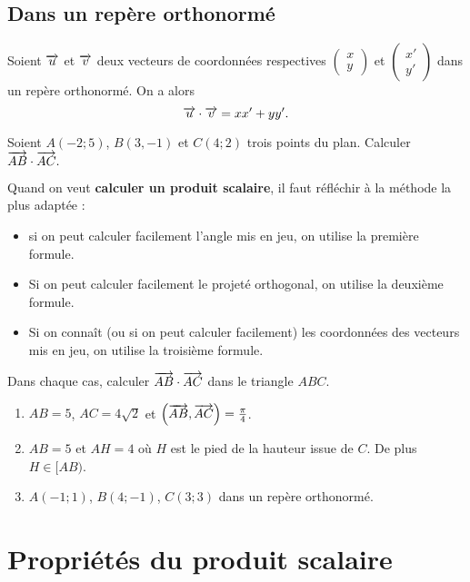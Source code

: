 \documentclass[11pt]{article}
\begin{document}
\subsection{Dans un repère orthonormé}
\begin{thm}
  Soient $\overrightarrow{u}$ et $\overrightarrow{v}$ deux vecteurs de coordonnées respectives
  $\begin{pmatrix}x\\y\end{pmatrix}$ et $\begin{pmatrix}x'\\y'\end{pmatrix}$
  dans un repère orthonormé. On a alors
  \[
    \overrightarrow{u}\cdot\overrightarrow{v} = xx'+yy'.
  \]
\end{thm}
\begin{app}
  Soient $A\left( -2;5 \right)$, $B\left( 3, -1 \right)$ et $C\left( 4; 2
  \right)$ trois points du plan. Calculer $\overrightarrow{AB}\cdot\overrightarrow{AC}.$
\end{app}
\begin{methode}
  Quand on veut \textbf{calculer un produit scalaire}, il faut réfléchir à la
  méthode la plus adaptée :
  \begin{itemize}
    \item si on peut calculer facilement l'angle mis en jeu, on utilise la
      première formule.
    \item Si on peut calculer facilement le projeté orthogonal, on utilise la
      deuxième formule.
    \item Si on connaît (ou si on peut calculer facilement) les coordonnées des
      vecteurs mis en jeu, on utilise la troisième formule.
  \end{itemize}
\end{methode}

\begin{app}
  Dans chaque cas, calculer $\overrightarrow{AB}\cdot\overrightarrow{AC}$ dans le triangle $ABC$.
  \begin{enumerate}
    \item $AB=5$, $AC=4\sqrt2$ et $\left( \overrightarrow{AB}, \overrightarrow{AC}
      \right)=\frac{\pi}{4}$.
    \item $AB=5$ et $AH=4$ où $H$ est le pied de la hauteur issue de $C$. De
      plus $H\in[AB)$.
    \item $A(-1;1)$, $B(4; -1)$, $C(3; 3)$ dans un repère orthonormé.
  \end{enumerate}
\end{app}

\section{Propriétés du produit scalaire}
\end{document}
